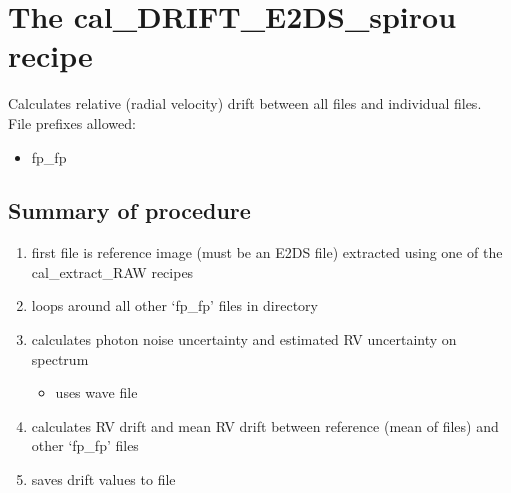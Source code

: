 

\clearpage
\newpage
\section{The cal\_DRIFT\_E2DS\_spirou recipe}
\label{section:cal_drift_e2ds}

Calculates relative (radial velocity) drift between all files and individual files. \\


\noindent File prefixes allowed:
\begin{itemize}
	\item fp\_fp
\end{itemize}

\subsection{Summary of procedure}
\begin{enumerate}
	\item first file is reference image (must be an E2DS file) extracted using one of the cal\_extract\_RAW recipes
	\item loops around all other `fp\_fp' files in directory
	\item calculates photon noise uncertainty and estimated RV uncertainty on spectrum
	\begin{itemize}
		\item uses wave file
	\end{itemize}
	\item calculates RV drift and mean RV drift between reference (mean of files) and other `fp\_fp' files
	\item saves drift values to file
\end{enumerate}


